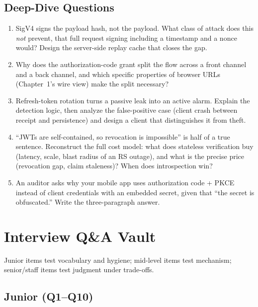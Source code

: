 \subsection*{Deep-Dive Questions}

\begin{enumerate}
  \item SigV4 signs the payload hash, not the payload. What class of attack
        does this \emph{not} prevent, that full request signing including a
        timestamp and a nonce would? Design the server-side replay cache
        that closes the gap.
  \item Why does the authorization-code grant split the flow across a front
        channel and a back channel, and which specific properties of browser
        URLs (Chapter~1's wire view) make the split necessary?
  \item Refresh-token rotation turns a passive leak into an active alarm.
        Explain the detection logic, then analyze the false-positive case
        (client crash between receipt and persistence) and design a client
        that distinguishes it from theft.
  \item ``JWTs are self-contained, so revocation is impossible'' is half of
        a true sentence. Reconstruct the full cost model: what does
        stateless verification buy (latency, scale, blast radius of an RS
        outage), and what is the precise price (revocation gap, claim
        staleness)? When does introspection win?
  \item An auditor asks why your mobile app uses authorization code + PKCE
        instead of client credentials with an embedded secret, given that
        ``the secret is obfuscated.'' Write the three-paragraph answer.
\end{enumerate}

\section{Interview Q\&A Vault}
\label{sec:ch5-qa}

Junior items test vocabulary and hygiene; mid-level items test mechanism;
senior/staff items test judgment under trade-offs.

\subsection*{Junior (Q1--Q10)}

